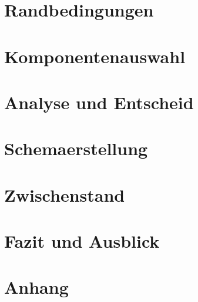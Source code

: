 \documentclass[]{article}
\begin{document}
\section{Randbedingungen}
\section{Komponentenauswahl}
\section{Analyse und Entscheid}

\section{Schemaerstellung}

\section{Zwischenstand}

\section{Fazit und Ausblick}

%

\section{Anhang}
\end{document}
